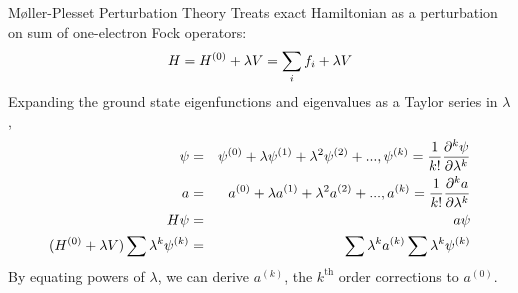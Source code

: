 \documentclass[aspectratio=169]{beamer}
\begin{document}
    \begin{frame}{M{\o}ller-Plesset Perturbation Theory}
        Treats exact Hamiltonian as a perturbation on sum of one-electron Fock operators:
        \begin{equation*}
            \footnotesize
            H = H^{(0)}+ \lambda V = \sum_i f_i + \lambda V
        \end{equation*}
        Expanding the ground state eigenfunctions and eigenvalues as a Taylor series in $\lambda$,
        \begin{eqnarray*}
            \footnotesize
            \psi & = & \psi^{(0)} + \lambda \psi^{(1)} + \lambda^2 \psi^{(2)} + ..., \psi^{(k)} = \frac{1}{k!}\frac{\partial^k \psi}{\partial \lambda^k}\\
            a & = & a^{(0)} + \lambda a^{(1)} + \lambda^2 a^{(2)} + ..., a^{(k)} = \frac{1}{k!}\frac{\partial^k a}{\partial \lambda^k}\\
            H\psi & = & a\psi\\
            (H^{(0)}+ \lambda V)\sum \lambda^k\psi^{(k)} & = & \sum \lambda^k a^{(k)}\sum \lambda^k\psi^{(k)}
        \end{eqnarray*}
        By equating powers of $\lambda$, we can derive $a^{(k)}$, the $k^{\mbox{th}}$ order corrections to $a^{(0)}$.
    \end{frame}
\end{document}
